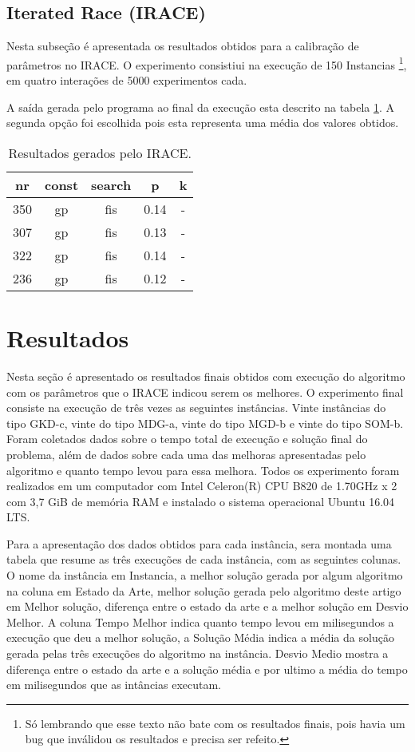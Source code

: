 \documentclass[12pt]{article}
\begin{document}
\subsection{Iterated Race (IRACE)}
Nesta subseção é apresentada os resultados obtidos para a calibração de parâmetros no IRACE. O experimento consistiui na execução de 150 Instancias \footnote{Só lembrando que esse texto não bate com os resultados finais, pois havia um bug que inválidou os resultados e precisa ser refeito.}, em quatro interações de 5000 experimentos cada.

A saída gerada pelo programa ao final da execução esta descrito na tabela \ref{tabela_resultado_irace}. A segunda opção foi escolhida pois esta representa uma média dos valores obtidos.

\begin{table}[t]
	\centering
	\begin{tabular}{| c | c | c | c | c |}
		\hline
		nr&const&search&p&k\\ \hline
		350&gp&fis&0.14&-\\ \hline
		307&gp&fis&0.13&-\\ \hline
		322&gp&fis&0.14&-\\ \hline
		236&gp&fis&0.12&-\\ \hline
	\end{tabular}
	\caption{Resultados gerados pelo IRACE.}
	\label{tabela_resultado_irace}
\end{table}

\section{Resultados}

Nesta seção é apresentado os resultados finais obtidos com execução do algoritmo com os parâmetros que o IRACE indicou serem os melhores. O experimento final consiste na execução de três vezes as seguintes instâncias. Vinte instâncias do tipo GKD-c, vinte do tipo MDG-a, vinte do tipo MGD-b e vinte do tipo SOM-b. Foram coletados dados sobre o tempo total de execução e solução final do problema, além de dados sobre cada uma das melhoras apresentadas pelo algoritmo e quanto tempo levou para essa melhora. Todos os experimento foram realizados em um computador com Intel Celeron(R) CPU B820 de 1.70GHz x 2 com 3,7 GiB de memória RAM e instalado o sistema operacional Ubuntu 16.04 LTS.

Para a apresentação dos dados obtidos para cada instância, sera montada uma tabela que resume as três execuções de cada instância, com as seguintes colunas. O nome da instância em Instancia, a melhor solução gerada por algum algoritmo na coluna em Estado da Arte, melhor solução gerada pelo algoritmo deste artigo em Melhor solução, diferença entre o estado da arte e a melhor solução em Desvio Melhor. A coluna Tempo Melhor indica quanto tempo levou em milisegundos a execução que deu a melhor solução, a Solução Média indica a média da solução gerada pelas três execuções do algoritmo na instância. Desvio Medio mostra a diferença entre o estado da arte e a solução média e por ultimo a média do tempo em milisegundos que as intâncias executam.
\end{document}
